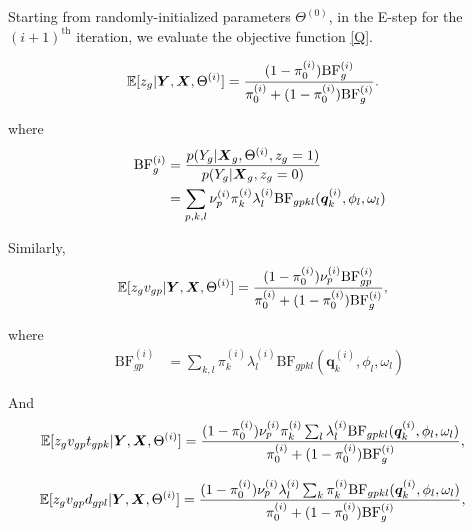 \documentclass[10pt]{article}
\newcommand{\Exp}{\mathbb{E}} %
\newcommand{\BF}{{\text{BF}}} %
\newcommand{\Xv}{\mbox{\boldmath$X$}}
\newcommand{\Yv}{\mbox{\boldmath$Y$}}
\begin{document}
Starting from randomly-initialized parameters $\Theta^{(0)}$, in the E-step for the $(i+1)^{\text{th}}$ iteration, we evaluate the objective function \eqref{Q}.

\begin{equation}
  \begin{aligned}
    \Exp[z_g | \Yv, \Xv, \Theta^{(i)}] &= \frac{(1-\pi_0^{(i)}) \BF^{(i)}_{g}}{\pi_0^{(i)} + (1-\pi_0^{(i)}) \BF^{(i)}_{g}}.
  \end{aligned}
\end{equation}

where 
\begin{equation}
  \begin{aligned}
    \BF^{(i)}_{g} &= \frac{p(Y_g | \Xv_g, \Theta^{(i)}, z_g=1)}{p(Y_g | \Xv_g, z_g=0)} \\
    &= \sum_{p,k,l} \nu_p^{(i)} \pi_k^{(i)} \lambda_l^{(i)} \BF_{gpkl}(\bm{q}_k^{(i)},\phi_l,\omega_l)
  \end{aligned}
\end{equation}

Similarly,
\begin{equation}
  \begin{aligned}
    \Exp[z_g v_{gp} | \Yv, \Xv, \Theta^{(i)}] &= \frac{(1-\pi_0^{(i)}) \nu_p^{(i)} \BF^{(i)}_{gp}}{\pi_0^{(i)} + (1-\pi_0^{(i)}) \BF^{(i)}_{g}},
  \end{aligned}
\end{equation}

where 
\begin{equation}
  \begin{aligned}
    \BF^{(i)}_{gp} &= \sum_{k,l} \pi_k^{(i)} \lambda_l^{(i)} \BF_{gpkl}(\bm{q}_k^{(i)},\phi_l,\omega_l)
  \end{aligned}
\end{equation}

And
\begin{equation}
  \begin{aligned}
    \Exp[z_g v_{gp} t_{gpk} | \Yv, \Xv, \Theta^{(i)}] &= \frac{(1-\pi_0^{(i)}) \nu_p^{(i)} \pi_k^{(i)} \sum_l \lambda_l^{(i)} \BF_{gpkl}(\bm{q}_k^{(i)},\phi_l,\omega_l)}{\pi_0^{(i)} + (1-\pi_0^{(i)}) \BF^{(i)}_{g}},
  \end{aligned}
\end{equation}

\begin{equation}
  \begin{aligned}
    \Exp[z_g v_{gp} d_{gpl} | \Yv, \Xv, \Theta^{(i)}] &= \frac{(1-\pi_0^{(i)}) \nu_p^{(i)} \lambda_l^{(i)} \sum_k \pi_k^{(i)} \BF_{gpkl}(\bm{q}_k^{(i)},\phi_l,\omega_l)}{\pi_0^{(i)} + (1-\pi_0^{(i)}) \BF^{(i)}_{g}},
  \end{aligned}
\end{equation}
\end{document}
